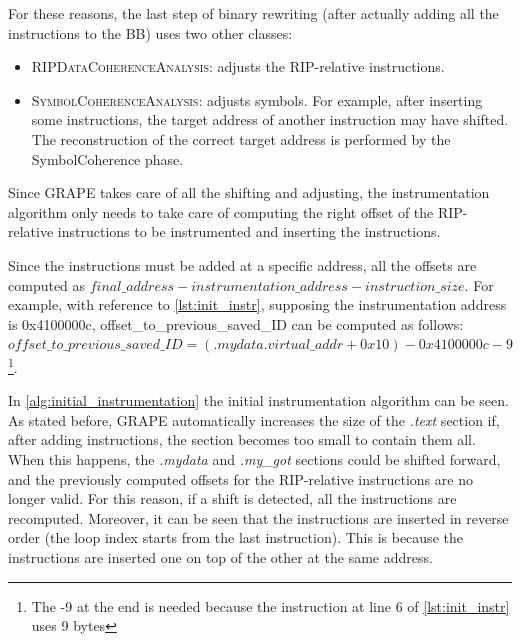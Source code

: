 For these reasons, the last step of binary rewriting (after actually adding all the instructions to the \gls{BB}) uses two other classes:
\begin{itemize}
    \item \textsc{RIPDataCoherenceAnalysis}: adjusts the RIP-relative instructions.
    \item \textsc{SymbolCoherenceAnalysis}: adjusts symbols. For example, after inserting some instructions,
        the target address of another instruction may have shifted. The reconstruction of the correct target address is
        performed by the SymbolCoherence phase.
\end{itemize}
Since GRAPE takes care of all the shifting and adjusting, the instrumentation algorithm only needs to take care
of computing the right offset of the RIP-relative instructions to be instrumented and inserting the instructions.

Since the instructions must be added at a specific address, all the offsets are computed as $final\_address - instrumentation\_address - instruction\_size$.
For example, with reference to \cref{lst:init_instr}, supposing the instrumentation address is 0x4100000c, offset\_to\_previous\_saved\_ID can be computed as follows:\\
$offset\_to\_previous\_saved\_ID=(\textit{.mydata}.virtual\_addr + 0x10) - 0x4100000c - 9$\footnote{
    The -9 at the end is needed because the instruction at line 6 of \cref{lst:init_instr} uses 9 bytes
}.

In \cref{alg:initial_instrumentation} the initial instrumentation algorithm can be seen.
As stated before, GRAPE automatically increases the size of the \textit{.text} section if, after adding instructions,
the section becomes too small to contain them all.
When this happens, the \textit{.mydata} and \textit{.my\_got} sections could be shifted forward, and the previously computed
offsets for the RIP-relative instructions are no longer valid.
For this reason, if a shift is detected, all the instructions are recomputed.
Moreover, it can be seen that the instructions are inserted in reverse order (the loop index starts from the last instruction).
This is because the instructions are inserted one on top of the other at the same address.

